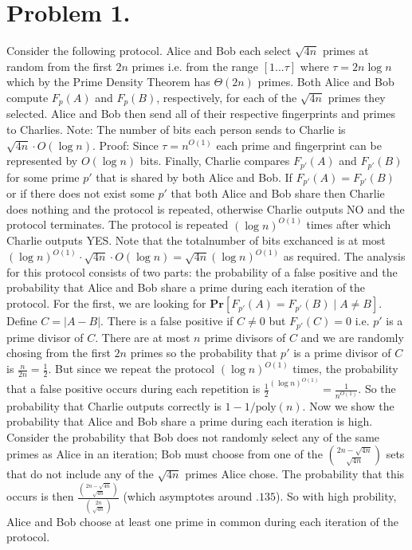 \documentclass[12pt]{article}
\begin{document}
\pagestyle{plain}
\titleformat{\subsection}[runin]
  {\normalfont\large\bfseries}{\thesubsection}{1em}{}
\titleformat{\subsubsection}[runin]
  {\normalfont\large\bfseries}{\thesubsubsection}{1em}{}

\section*{Problem 1.}
Consider the following protocol. Alice and Bob each select $\sqrt{4n}$ primes
at random from the first $2n$ primes i.e. from the range $[1...\tau]$ where
$\tau = 2n\log{n}$ which by the Prime Density Theorem has $\Theta(2n)$
primes. Both Alice and Bob compute $F_p(A)$ and $F_p(B)$, respectively, for
each of the $\sqrt{4n}$ primes they selected. Alice and Bob then send all of their
respective fingerprints and primes to Charlies. Note: The number of bits
each person sends to Charlie is $\sqrt{4n}\cdot O(\log{n})$. Proof: Since
$\tau = n^{O(1)}$ each prime and fingerprint can be represented by
$O(\log{n})$ bits. Finally, Charlie compares $F_{p'}(A)$ and $F_{p'}(B)$ for
some prime $p'$ that is shared by both Alice and Bob. If $F_{p'}(A) = F_{p'}(B)$
or if there does not exist some $p'$ that both Alice and Bob share then Charlie
does nothing and the protocol is repeated, otherwise Charlie outputs NO and the
protocol terminates. The protocol is repeated $(\log{n})^{O(1)}$ times after
which Charlie outputs YES. Note that the totalnumber of bits exchanced is at most
$(\log{n})^{O(1)} \cdot \sqrt{4n}\cdot O(\log{n}) = \sqrt{4n}(\log n)^{O(1)}$
as required. The analysis for this protocol consists of two parts:
the probability of a false positive and the probability that Alice and Bob share
a prime during each iteration of the protocol. For the first, we are looking for
$\textbf{Pr}[F_{p'}(A) = F_{p'}(B) \mid A \neq B]$. Define $C = |A-B|$. There
is a false positive if $C \neq 0$ but $F_{p'}(C) = 0$ i.e. $p'$ is a prime divisor
of $C$. There are at most $n$ prime divisors of $C$ and we are randomly chosing
from the first $2n$ primes so the probability that $p'$ is a prime divisor of
$C$ is $\frac{n}{2n} = \frac{1}{2}$. But since we repeat the protocol
$(\log{n})^{O(1)}$ times, the probability that a false positive occurs during
each repetition is $\frac{1}{2}^{(\log{n})^{O(1)}} = \frac{1}{n^{O(1)}}$. So
the probability that Charlie outputs correctly is $1-1/\text{poly}(n)$. Now
we show the probability that Alice and Bob share a prime during each iteration
is high. Consider the probability that Bob does not randomly select any of the
same primes as Alice in an iteration; Bob must choose from one of the
$2n-\sqrt{4n} \choose \sqrt{4n}$ sets that do not include any of the
$\sqrt{4n}$ primes Alice chose. The probability that this occurs is then
$\frac{{2n-\sqrt{4n} \choose \sqrt{4n}}}{{2n \choose \sqrt{4n}}}$
(which asymptotes around $.135$). So with high probility, Alice and Bob
choose at least one prime in common during each iteration of the protocol.
\end{document}
